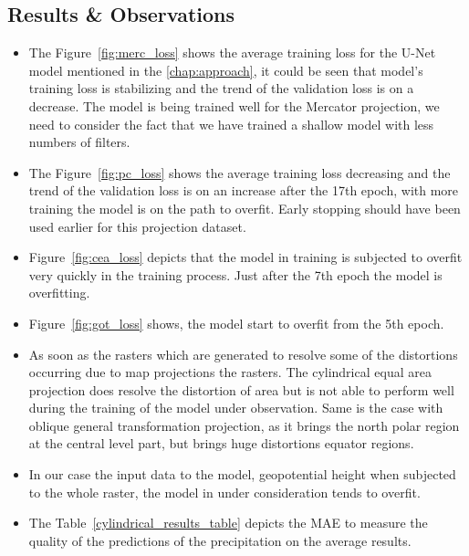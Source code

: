 \subsection{Results \& Observations}
\begin{itemize}
    \item The Figure~\ref{fig:merc_loss} shows the average training loss for the U-Net model mentioned in the \autoref{chap:approach}, it could be seen that model's training loss is stabilizing and the trend of the validation loss is on a decrease.
          The model is being trained well for the Mercator projection, we need to consider the fact that we have trained a shallow model with less numbers of filters.
    \item The Figure~\ref{fig:pc_loss} shows the average training loss decreasing and the trend of the validation loss is on an increase after the 17th epoch, with more training the model is on the path to overfit. Early stopping should have been used earlier for this projection dataset.
    \item Figure~\ref{fig:cea_loss} depicts that the model in training is subjected to overfit very quickly in the training process. Just after the 7th epoch the model is overfitting.
    \item Figure~\ref{fig:got_loss} shows, the model start to overfit from the 5th epoch.
    \item As soon as the rasters which are generated to resolve some of the distortions occurring due to map projections the rasters.
          The cylindrical equal area projection does resolve the distortion of area but is not able to perform well during the training of the model under observation.
          Same is the case with oblique general transformation projection, as it brings the north polar region at the central level part, but brings huge distortions equator regions.
    \item In our case the input data to the model, geopotential height when subjected to the whole raster, the model in under consideration tends to overfit.
    \item The Table~\ref{cylindrical_results_table} depicts the MAE to measure the quality of the predictions of the precipitation on the average results.

\end{itemize}
